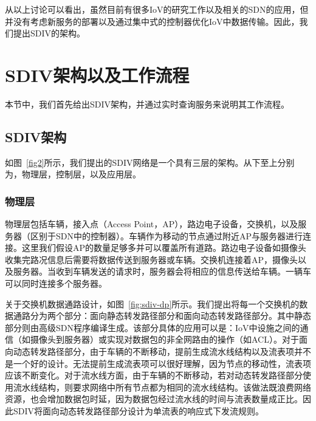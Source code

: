 从以上讨论可以看出，虽然目前有很多IoV的研究工作以及相关的SDN的应用，但并没有考虑新服务的部署以及通过集中式的控制器优化IoV中数据传输。因此，我们提出SDIV的架构。


\section{SDIV架构以及工作流程} 

本节中，我们首先给出SDIV架构，并通过实时查询服务来说明其工作流程。


\subsection{SDIV架构}

如图~\ref{fig2}所示，我们提出的SDIV网络是一个具有三层的架构。从下至上分别为，物理层，控制层，以及应用层。


\subsubsection{物理层}

物理层包括车辆，接入点（Access Point，AP），路边电子设备，交换机，以及服务器（区别于SDN中的控制器）。车辆作为移动的节点通过附近AP与服务器进行连接。这里我们假设AP的数量足够多并可以覆盖所有道路。路边电子设备如摄像头收集完路况信息后需要将数据传送到服务器或车辆。交换机连接着AP，摄像头以及服务器。当收到车辆发送的请求时，服务器会将相应的信息传送给车辆。一辆车可以同时连接多个服务器。

关于交换机数据通路设计，如图~\ref{fig:sdiv-dp}所示。我们提出将每一个交换机的数据通路分为两个部分：面向静态转发路径部分和面向动态转发路径部分。其中静态部分则由高级SDN程序编译生成。该部分具体的应用可以是：IoV中设施之间的通信（如摄像头到服务器）或实现对数据包的非全网路由的操作（如ACL）。对于面向动态转发路径部分，由于车辆的不断移动，提前生成流水线结构以及流表项并不是一个好的设计。无法提前生成流表项可以很好理解，因为节点的移动性，流表项应该不断变化。对于流水线方面，由于车辆的不断移动，若对动态转发路径部分使用流水线结构，则要求网络中所有节点都为相同的流水线结构。该做法既浪费网络资源，也会增加数据包时延，因为数据包经过流水线的时间与流表数量成正比。因此SDIV将面向动态转发路径部分设计为单流表的响应式下发流规则。

